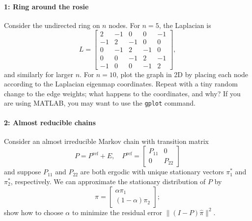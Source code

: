 \documentclass[12pt, leqno]{article} %
\begin{document}

\paragraph*{1: Ring around the rosie}
Consider the undirected ring on $n$ nodes.  For $n = 5$, the Laplacian
is
\[
L = \begin{bmatrix}
       2 & -1 &  0  &  0 & -1 \\
      -1 &  2 & -1  &  0 &  0 \\
       0 & -1 &  2  & -1 &  0 \\
       0 &  0 & -1  &  2 & -1 \\
      -1 &  0 &  0  & -1 &  2
    \end{bmatrix},
\]
and similarly for larger $n$.  For $n = 10$, plot the graph in 2D by
placing each node according to the Laplacian eigenmap coordinates.
Repeat with a tiny random change to the edge weights; what happens to
the coordinates, and why?
If you are using MATLAB, you may want to use the {\tt gplot} command.

\paragraph*{2: Almost reducible chains}
Consider an almost irreducible Markov chain with transition matrix
\[
  P = P^{\mathrm{ref}} + E, \quad
  P^{\mathrm{ref}} = \begin{bmatrix} P_{11} & 0 \\ 0 & P_{22} \end{bmatrix}
\]
and suppose $P_{11}$ and $P_{22}$ are both ergodic with unique
stationary vectors $\pi_1^*$ and $\pi_2^*$, respectively.
We can approximate the stationary distribution of $P$ by
\[
  \hat{\pi} = \begin{bmatrix} \alpha \pi_1 \\ (1-\alpha) \pi_2 \end{bmatrix};
\]
show how to choose $\alpha$ to minimize the residual error
$\|(I-P) \hat{\pi}\|^2$.
\end{document}
